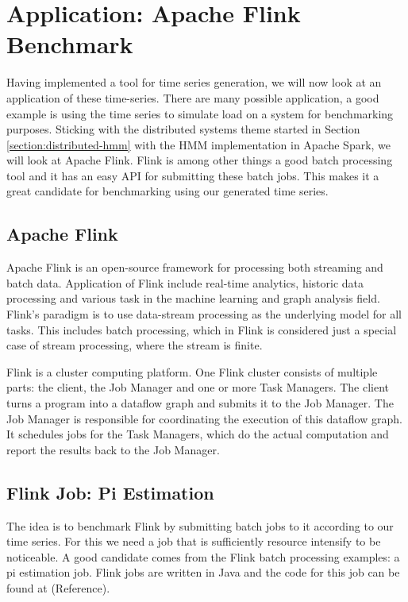 \chapter{Application: Apache Flink Benchmark}\label{chapter:benchmark}

Having implemented a tool for time series generation, we will now look at an application of these time-series. There are many possible application, a good example is using the time series to simulate load on a system for benchmarking purposes. Sticking with the distributed systems theme started in Section \ref{section:distributed-hmm} with the HMM implementation in Apache Spark, we will look at Apache Flink. Flink is among other things a good batch processing tool and it has an easy API for submitting these batch jobs. This makes it a great candidate for benchmarking using our generated time series. 

\section{Apache Flink}

Apache Flink is an open-source framework for processing both streaming and batch data. Application of Flink include real-time analytics, historic data processing and various task in the machine learning and graph analysis field. Flink's paradigm is to use data-stream processing as the underlying model for all tasks. This includes batch processing, which in Flink is considered just a special case of stream processing, where the stream is finite. 

Flink is a cluster computing platform. One Flink cluster consists of multiple parts: the client, the Job Manager and one or more Task Managers. The client turns a program into a dataflow graph and submits it to the Job Manager. The Job Manager is responsible for coordinating the execution of this dataflow graph. It schedules jobs for the Task Managers, which do the actual computation and report the results back to the Job Manager. 

\section{Flink Job: Pi Estimation}

The idea is to benchmark Flink by submitting batch jobs to it according to our time series. For this we need a job that is sufficiently resource intensify to be noticeable. A good candidate comes from the Flink batch processing examples: a pi estimation job. Flink jobs are written in Java and the code for this job can be found at (Reference). 

